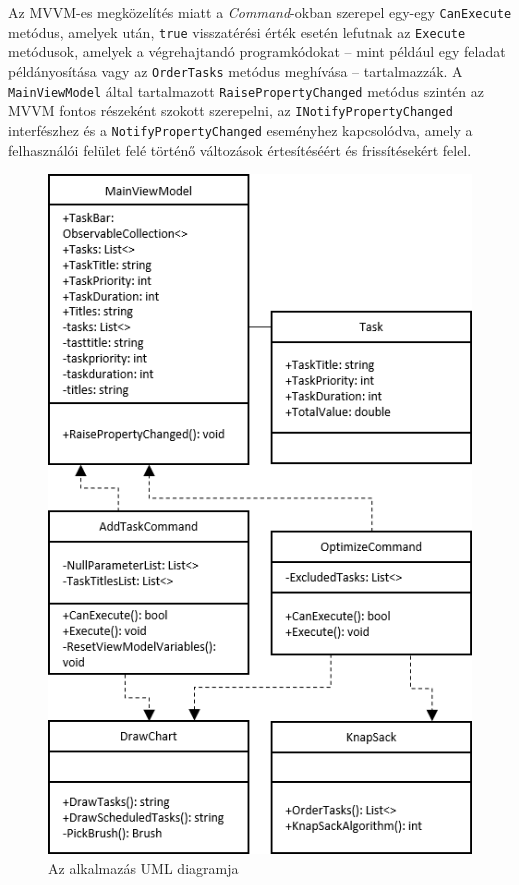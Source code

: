 Az MVVM-es megközelítés miatt a \textit{Command}-okban szerepel egy-egy \texttt{CanExecute} metódus, amelyek után, \texttt{true} visszatérési érték esetén lefutnak az \texttt{Execute} metódusok, amelyek a végrehajtandó programkódokat -- mint például egy feladat példányosítása vagy az \texttt{OrderTasks} metódus meghívása -- tartalmazzák. A  \texttt{MainViewModel} által tartalmazott \texttt{RaisePropertyChanged} metódus szintén az MVVM fontos részeként szokott szerepelni, az \texttt{INotifyPropertyChanged} interfészhez és a \texttt{NotifyPropertyChanged} eseményhez kapcsolódva, amely a felhasználói felület felé történő változások értesítéséért és frissítésekért felel.

\begin{figure}[h]
	\centering
	\includegraphics[width=\textwidth]{images/uml.png}
	\caption{Az alkalmazás UML diagramja}
	\label{fig:uml}
\end{figure}
